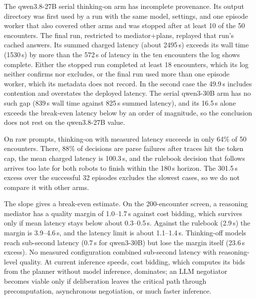 \documentclass[journal]{IEEEtran}
\begin{document}
The qwen3.8-27B serial thinking-on arm has incomplete provenance. Its output directory was first used by a run with the same model, settings, and one episode worker that also covered other arms and was stopped after at least 10 of the 50 encounters. The final run, restricted to mediator+plans, replayed that run's cached answers. Its summed charged latency (about 2495\,s) exceeds its wall time (1530\,s) by more than the 572\,s of latency in the ten encounters the log shows complete. Either the stopped run completed at least 18 encounters, which its log neither confirms nor excludes, or the final run used more than one episode worker, which its metadata does not record. In the second case the 49.9\,s includes contention and overstates the deployed latency. The serial qwen3-30B arm has no such gap (839\,s wall time against 825\,s summed latency), and its 16.5\,s alone exceeds the break-even latency below by an order of magnitude, so the conclusion does not rest on the qwen3.8-27B value. %

On raw prompts, thinking-on with measured latency succeeds in only 64\% of 50 encounters. There, 88\% of decisions are parse failures after traces hit the token cap, the mean charged latency is 100.3\,s, and the rulebook decision that follows arrives too late for both robots to finish within the 180\,s horizon. The 301.5\,s excess over the successful 32 episodes excludes the slowest cases, so we do not compare it with other arms.

The slope gives a break-even estimate. On the 200-encounter screen, a reasoning mediator has a quality margin of 1.0--1.7\,s against cost bidding, which survives only if mean latency stays below about 0.3--0.5\,s. Against the rulebook (2.9\,s) the margin is 3.9--4.6\,s, and the latency limit is about 1.1--1.4\,s. Thinking-off models reach sub-second latency (0.7\,s for qwen3-30B) but lose the margin itself (23.6\,s excess). No measured configuration combined sub-second latency with reasoning-level quality. At current inference speeds, cost bidding, which computes its bids from the planner without model inference, dominates; an LLM negotiator becomes viable only if deliberation leaves the critical path through precomputation, asynchronous negotiation, or much faster inference.
\end{document}
